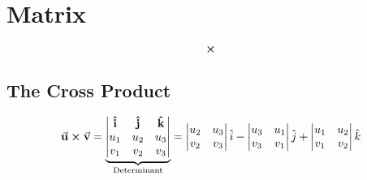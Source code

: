 \chapter{Matrix}

\begin{equation}
  \cross
\end{equation}

\section{The Cross Product}

\begin{equation}
  \va{u} \cross \va{v} =
  \underbrace{
    \begin{vmatrix}
      \vu{i} & \vu{j} & \vu{k} \\
      u_1    & u_2    & u_3    \\
      v_1    & v_2    & v_3
    \end{vmatrix}
  }_{\text{Determinant}} =
  \begin{vmatrix}
    u_2 & u_3 \\
    v_2 & v_3
  \end{vmatrix} \hat{i} -
  \begin{vmatrix}
    u_3 & u_1 \\
    v_3 & v_1
  \end{vmatrix} \hat{j} +
  \begin{vmatrix}
    u_1 & u_2 \\
    v_1 & v_2
  \end{vmatrix} \hat{k}
\end{equation}
